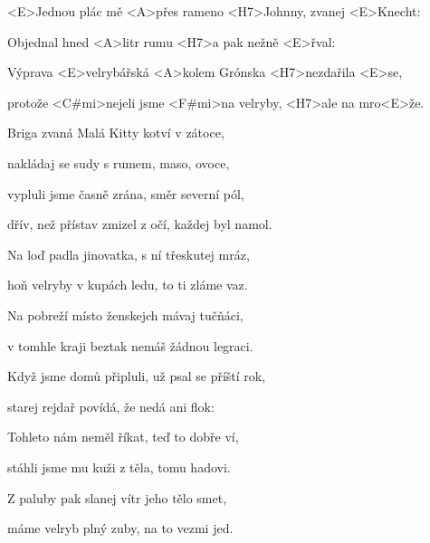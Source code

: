 

\zs
<E>Jednou plác mě <A>přes rameno <H7>Johnny, zvanej <E>Knecht:


Objednal hned <A>litr rumu <H7>a pak nežně <E>řval:

\ks

\zr
Výprava <E>velrybářská <A>kolem Grónska <H7>nezdařila <E>se,

protože <C#mi>nejeli jsme <F#mi>na velryby, <H7>ale na mro<E>že.
\kr

\zs
Briga zvaná Malá Kitty kotví v zátoce,

nakládaj se sudy s rumem, maso, ovoce,

vypluli jsme časně zrána, směr severní pól,

dřív, než přístav zmizel z očí, každej byl namol.
\ks

\zr \kr

\zs
Na loď padla jinovatka, s ní třeskutej mráz,

hoň velryby v kupách ledu, to ti zláme vaz.

Na pobreží místo ženskejch mávaj tučňáci,

v tomhle kraji beztak nemáš žádnou legraci.
\ks

\zr \kr

\zs
Když jsme domů připluli, už psal se příští rok,

starej rejdař povídá, že nedá ani flok:

\ks

\zr \kr

\zs
Tohleto nám neměl říkat, teď to dobře ví,

stáhli jsme mu kuži z těla, tomu hadovi.

Z paluby pak slanej vítr jeho tělo smet,

máme velryb plný zuby, na to vezmi jed.
\ks

\zr \kr

\kp
